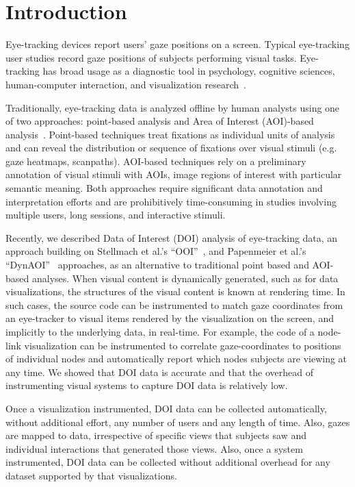 \section{Introduction}
Eye-tracking devices report users' gaze positions on a screen. Typical eye-tracking user studies record gaze positions of subjects performing visual tasks. Eye-tracking has broad usage as a diagnostic tool in psychology, cognitive sciences, human-computer interaction, and visualization research~\cite{duchowski2002breadth}.

Traditionally, eye-tracking data is analyzed offline by human analysts using one of two approaches: point-based analysis and Area of Interest (AOI)-based analysis~\cite{blascheck2014state}. Point-based techniques treat fixations as individual units of analysis and can reveal the distribution or sequence of fixations over visual stimuli (e.g. gaze heatmaps, scanpaths). AOI-based techniques rely on a preliminary annotation of visual stimuli with AOIs, image regions of interest with particular semantic meaning.  Both approaches require significant data annotation and interpretation efforts and are prohibitively time-consuming in studies involving multiple users, long sessions, and interactive stimuli. 

Recently, we described Data of Interest (DOI) analysis of eye-tracking data, an approach building on Stellmach et al.'s ``OOI''~\cite{stellmach20103d}, and Papenmeier et al.'s ``DynAOI''~\cite{papenmeier2010dynaoi} approaches, as an alternative to traditional point based and AOI-based analyses. When visual content is dynamically generated, such as for data visualizations, the structures of the visual content is known at rendering time.  In such cases, the source code can be instrumented to match gaze coordinates from an eye-tracker to visual items rendered by the visualization on the screen, and implicitly to the underlying data, in real-time. For example, the code of a node-link visualization can be instrumented to correlate gaze-coordinates to positions of individual nodes and automatically report which nodes subjects are viewing at any time.  We showed that DOI data is accurate and that the overhead of instrumenting visual systems to capture DOI data is relatively low. 

Once a visualization instrumented, DOI data can be collected automatically, without additional effort, any number of users and any length of time. Also, gazes are mapped to data, irrespective of specific views that subjects saw and individual interactions that generated those views. Also, once a system instrumented, DOI data can be collected without additional overhead for any dataset supported by that visualizations.

